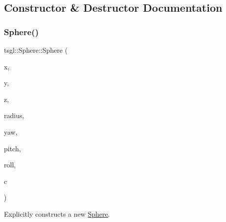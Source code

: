 \subsection{Constructor \& Destructor Documentation}
\mbox{\label{classtsgl_1_1_sphere_a80d326f71e37a88274d479c87ad96efe}} 
\subsubsection{\texorpdfstring{Sphere()}{Sphere()}\hspace{0.1cm}{\footnotesize\ttfamily [1/2]}}
{\footnotesize\ttfamily tsgl\+::\+Sphere\+::\+Sphere (\begin{DoxyParamCaption}\item[{float}]{x,  }\item[{float}]{y,  }\item[{float}]{z,  }\item[{G\+Lfloat}]{radius,  }\item[{float}]{yaw,  }\item[{float}]{pitch,  }\item[{float}]{roll,  }\item[{\hyperlink{structtsgl_1_1_color_float}{Color\+Float}}]{c }\end{DoxyParamCaption})}



Explicitly constructs a new \hyperlink{classtsgl_1_1_sphere}{Sphere}. 

